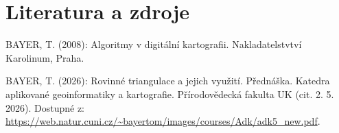 \section{Literatura a zdroje}

BAYER, T. (2008): Algoritmy v digitální kartografii. Nakladatelstvtví Karolinum, Praha.

BAYER, T. (2026): Rovinné triangulace a jejich využití. Přednáška.
Katedra aplikované geoinformatiky a kartografie. Přírodovědecká fakulta UK (cit. 2. 5. 2026). Dostupné z: \url{https://web.natur.cuni.cz/~bayertom/images/courses/Adk/adk5_new.pdf}.

